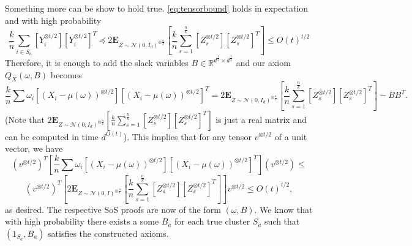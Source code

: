 \documentclass[12pt]{article}%
\newcommand{\expect}{\mathbf{E}}
\begin{document}
\noindent
Something more can be show to hold true. \cref{eq:tensorbound} holds in expectation and with high probability
$$
\frac{k}{n}
\sum_{i \in S_a}
\left[Y_i^{\otimes t/2}\right]
\left[Y_i^{\otimes t/2}\right]^T \preceq 
 2 \expect_{Z \sim \mathcal{N}(0,I_d)^{\otimes \frac{n}{k}}} \left[
\frac{k}{n} \sum_{s = 1}^{\frac{n}{k}}
\left[Z_s^{\otimes t/2}\right]
\left[Z_s^{\otimes t/2}\right]^T \right]\le 
O(t)^{t/2}
$$
Therefore, it is enough to add the slack variables 
$B \in \mathbb{R}^{d^{\frac{t}{2}}\times d^{\frac{t}{2}}}$ and our axiom $Q_X(\omega, B)$ becomes
$$
\frac{k}{n}
\sum \omega_i
\left[(X_i - \mu(\omega))^{\otimes t/2}\right]
\left[(X_i - \mu(\omega))^{\otimes t/2}\right]^T  =
2 \expect_{Z \sim \mathcal{N}(0,I_d)^{\otimes \frac{n}{k}}} \left[
\frac{k}{n} \sum_{s = 1}^{\frac{n}{k}}
\left[Z_s^{\otimes t/2}\right]
\left[Z_s^{\otimes t/2}\right]^T\right] - 
BB^T.
$$
(Note that $2 \expect_{Z \sim \mathcal{N}(0,I_d)^{\otimes \frac{n}{k}}} \left[
\frac{k}{n} \sum_{s = 1}^{\frac{n}{k}}
\left[Z_s^{\otimes t/2}\right]
\left[Z_s^{\otimes t/2}\right]^T\right]$ is just a real matrix and can be computed in time $d^{O(t)}$).
This implies that for any tensor $v^{\otimes t/2}$ of a unit vector, we have 
$$
(v^{\otimes t/2})^T
\left[
\frac{k}{n}
\sum \omega_i
\left[(X_i - \mu(\omega))^{\otimes t/2}\right]
\left[(X_i - \mu(\omega))^{\otimes t/2}\right]^T
\right]
(v^{\otimes t/2})
\le $$
$$
(v^{\otimes t/2})^T\left[2 \expect_{Z \sim \mathcal{N}(0,I)^{\otimes \frac{n}{k}}} \left[
\frac{k}{n} \sum_{s = 1}^{\frac{n}{k}}
\left[Z_s^{\otimes t/2}\right]
\left[Z_s^{\otimes t/2}\right]^T \right]\right] 
v^{\otimes t/2}\le 
O(t)^{t/2},
$$
as desired. The respective SoS proofs are now of the form $(\omega, B).$ We know that with high probability there exists a some $B_a$ for each true cluster 
$S_a$ such that $(1_{S_a}, B_a)$ satisfies the constructed axioms. 

\printbibliography

\appendix
\end{document}
